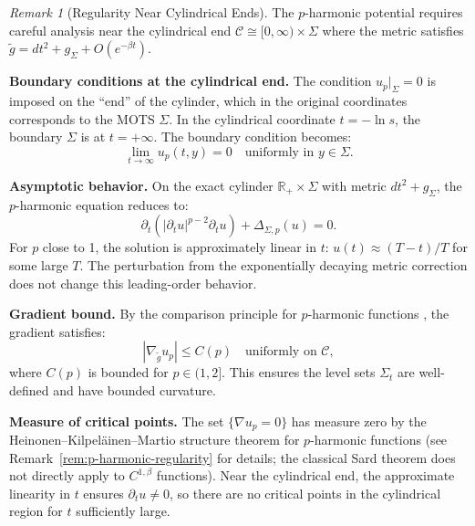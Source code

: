 \documentclass[12pt]{article}
\theoremstyle{plain}
\theoremstyle{definition}
\theoremstyle{remark}
\newtheorem{remark}[theorem]{Remark}
\newcommand{\tg}{\tilde{g}}
\begin{document}
\begin{remark}[Regularity Near Cylindrical Ends]\label{rem:cylindrical-regularity}
The $p$-harmonic potential requires careful analysis near the cylindrical end $\mathcal{C} \cong [0, \infty) \times \Sigma$ where the metric satisfies $\tg = dt^2 + g_\Sigma + O(e^{-\beta t})$.

\textbf{Boundary conditions at the cylindrical end.} The condition $u_p|_\Sigma = 0$ is imposed on the ``end'' of the cylinder, which in the original coordinates corresponds to the MOTS $\Sigma$. In the cylindrical coordinate $t = -\ln s$, the boundary $\Sigma$ is at $t = +\infty$. The boundary condition becomes:
\[
\lim_{t \to \infty} u_p(t, y) = 0 \quad \text{uniformly in } y \in \Sigma.
\]

\textbf{Asymptotic behavior.} On the exact cylinder $\mathbb{R}_+ \times \Sigma$ with metric $dt^2 + g_\Sigma$, the $p$-harmonic equation reduces to:
\[
\partial_t(|\partial_t u|^{p-2} \partial_t u) + \Delta_{\Sigma, p}(u) = 0.
\]
For $p$ close to 1, the solution is approximately linear in $t$: $u(t) \approx (T - t)/T$ for some large $T$. The perturbation from the exponentially decaying metric correction does not change this leading-order behavior.

\textbf{Gradient bound.} By the comparison principle for $p$-harmonic functions \cite{tolksdorf1984}, the gradient satisfies:
\[
|\nabla_{\tg} u_p| \leq C(p) \quad \text{uniformly on } \mathcal{C},
\]
where $C(p)$ is bounded for $p \in (1, 2]$. This ensures the level sets $\Sigma_t$ are well-defined and have bounded curvature.

\textbf{Measure of critical points.} The set $\{\nabla u_p = 0\}$ has measure zero by the Heinonen--Kilpel\"ainen--Martio structure theorem for $p$-harmonic functions \cite{heinonen1993} (see Remark~\ref{rem:p-harmonic-regularity} for details; the classical Sard theorem does not directly apply to $C^{1,\beta}$ functions). Near the cylindrical end, the approximate linearity in $t$ ensures $\partial_t u \neq 0$, so there are no critical points in the cylindrical region for $t$ sufficiently large.
\end{remark}
\end{document}
